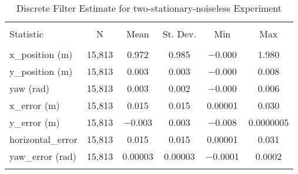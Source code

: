 
\begin{table}[h] \centering 
  \caption{Discrete Filter Estimate for two-stationary-noiseless Experiment} 
  \label{tab:two_stationary_noiseless_discrete_summary} 
\begin{tabular}{@{\extracolsep{5pt}}lccccc} 
\\[-1.8ex]\hline 
\hline \\[-1.8ex] 
Statistic & \multicolumn{1}{c}{N} & \multicolumn{1}{c}{Mean} & \multicolumn{1}{c}{St. Dev.} & \multicolumn{1}{c}{Min} & \multicolumn{1}{c}{Max} \\ 
\hline \\[-1.8ex] 
x\_position (m) & 15,813 & \num{0.972} & \num{0.985} & \num{-0.000} & \num{1.980} \\ 
y\_position (m) & 15,813 & \num{0.003} & \num{0.003} & \num{-0.000} & \num{0.008} \\ 
yaw (rad) & 15,813 & \num{0.003} & \num{0.002} & \num{-0.000} & \num{0.006} \\ 
x\_error (m) & 15,813 & \num{0.015} & \num{0.015} & \num{0.00001} & \num{0.030} \\ 
y\_error (m) & 15,813 & \num{-0.003} & \num{0.003} & \num{-0.008} & \num{0.0000005} \\ 
horizontal\_error & 15,813 & \num{0.015} & \num{0.015} & \num{0.00001} & \num{0.031} \\ 
yaw\_error (rad) & 15,813 & \num{0.00003} & \num{0.00003} & \num{-0.0001} & \num{0.0002} \\ 
\hline \\[-1.8ex] 
\end{tabular} 
\end{table} 
